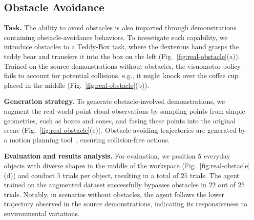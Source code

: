 






\subsection{Obstacle Avoidance}
\noindent\textbf{Task.}
The ability to avoid obstacles is also imparted through demonstrations containing obstacle-avoidance behaviors. To investigate such capability, we introduce obstacles to a Teddy-Box task, where the dexterous hand grasps the teddy bear and transfers it into the box on the left (Fig.~\ref{fig:real-obstacle}(a)). Trained on the source demonstrations without obstacles, the visuomotor policy fails to account for potential collisions, e.g., it might knock over the coffee cup placed in the middle (Fig.~\ref{fig:real-obstacle}(b)). 

\vspace{0.2cm} \noindent\textbf{Generation strategy.}
To generate obstacle-involved demonstrations, we augment the real-world point cloud observations by sampling points from simple geometries, such as boxes and cones, and fusing these points into the original scene (Fig.~\ref{fig:real-obstacle}(c)). Obstacle-avoiding trajectories are generated by a motion planning tool~\cite{kuffner2000rrt}, ensuring collision-free actions.

\vspace{0.2cm} \noindent\textbf{Evaluation and results analysis.}
For evaluation, we position $5$ everyday objects with diverse shapes in the middle of the workspace (Fig.~\ref{fig:real-obstacle}(d)) and conduct $5$ trials per object, resulting in a total of $25$ trials. The agent trained on the augmented dataset successfully bypasses obstacles in $22$ out of $25$ trials. Notably, in scenarios without obstacles, the agent follows the lower trajectory observed in the source demonstrations, indicating its responsiveness to environmental variations.





